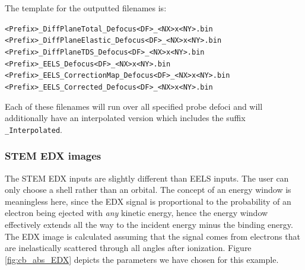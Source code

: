 \documentclass[12pt,a4paper]{article}
\newenvironment{myenv}{\begin{samepage}\begin{adjustwidth}{2cm}{}}{\end{adjustwidth}\end{samepage}}
\begin{document}
The template for the outputted filenames is:
%
\begin{myenv}
    \verb|<Prefix>_DiffPlaneTotal_Defocus<DF>_<NX>x<NY>.bin| \\
    \verb|<Prefix>_DiffPlaneElastic_Defocus<DF>_<NX>x<NY>.bin| \\
    \verb|<Prefix>_DiffPlaneTDS_Defocus<DF>_<NX>x<NY>.bin| \\
    \verb|<Prefix>_EELS_Defocus<DF>_<NX>x<NY>.bin| \\
    \verb|<Prefix>_EELS_CorrectionMap_Defocus<DF>_<NX>x<NY>.bin| \\
    \verb|<Prefix>_EELS_Corrected_Defocus<DF>_<NX>x<NY>.bin| \\
\end{myenv}
%
Each of these filenames will run over all specified probe defoci and will additionally have an interpolated version which includes the suffix \verb|_Interpolated|.

\subsubsection{STEM EDX images}

The STEM EDX inputs are slightly different than EELS inputs.
The user can only choose a shell rather than an orbital.
The concept of an energy window is meaningless here, since the EDX signal is proportional to the probability of an electron being ejected with \emph{any} kinetic energy, hence the energy window effectively extends all the way to the incident energy minus the binding energy.
The EDX image is calculated assuming that the signal comes from electrons that are inelastically scattered through all angles after ionization.
Figure \ref{fig:cb_abs_EDX} depicts the parameters we have chosen for this example.
\end{document}
